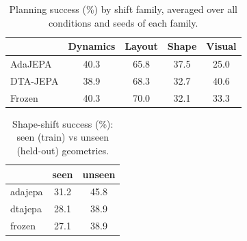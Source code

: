 \begin{table}[t]
\centering
\caption{Planning success (\%) by shift family, averaged over all conditions and seeds of each family.}
\label{tab:family}
\begin{tabular}{lcccc}
\toprule
 & Dynamics & Layout & Shape & Visual \\
\midrule
AdaJEPA & 40.3 & 65.8 & 37.5 & 25.0 \\
DTA-JEPA & 38.9 & 68.3 & 32.7 & 40.6 \\
Frozen & 40.3 & 70.0 & 32.1 & 33.3 \\
\bottomrule
\end{tabular}
\end{table}

\begin{table}[t]
\centering
\caption{Shape-shift success (\%): seen (train) vs unseen (held-out) geometries.}
\label{tab:seenunseen}
\begin{tabular}{lcc}
\toprule
 & seen & unseen \\
\midrule
adajepa & 31.2 & 45.8 \\
dtajepa & 28.1 & 38.9 \\
frozen & 27.1 & 38.9 \\
\bottomrule
\end{tabular}
\end{table}
